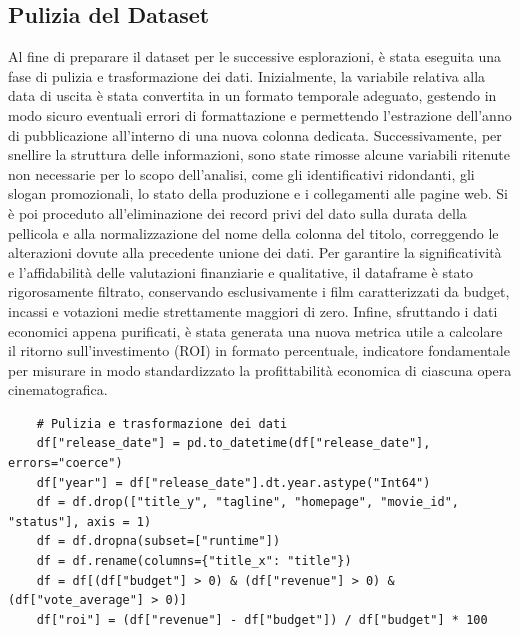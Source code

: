 \documentclass{article}
\begin{document}
\subsection{Pulizia del Dataset}
Al fine di preparare il dataset per le successive esplorazioni, \`e stata eseguita una fase di pulizia e trasformazione dei dati. Inizialmente, la variabile relativa alla data di uscita \`e stata convertita in un formato temporale adeguato, gestendo in modo sicuro eventuali errori di formattazione e permettendo l'estrazione dell'anno di pubblicazione all'interno di una nuova colonna dedicata. Successivamente, per snellire la struttura delle informazioni, sono state rimosse alcune variabili ritenute non necessarie per lo scopo dell'analisi, come gli identificativi ridondanti, gli slogan promozionali, lo stato della produzione e i collegamenti alle pagine web. Si \`e poi proceduto all'eliminazione dei record privi del dato sulla durata della pellicola e alla normalizzazione del nome della colonna del titolo, correggendo le alterazioni dovute alla precedente unione dei dati. Per garantire la significativit\`a e l'affidabilit\`a delle valutazioni finanziarie e qualitative, il dataframe \`e stato rigorosamente filtrato, conservando esclusivamente i film caratterizzati da budget, incassi e votazioni medie strettamente maggiori di zero. Infine, sfruttando i dati economici appena purificati, \`e stata generata una nuova metrica utile a calcolare il ritorno sull'investimento (ROI) in formato percentuale, indicatore fondamentale per misurare in modo standardizzato la profittabilit\`a economica di ciascuna opera cinematografica.
\begin{lstlisting}
	# Pulizia e trasformazione dei dati
	df["release_date"] = pd.to_datetime(df["release_date"], errors="coerce")
	df["year"] = df["release_date"].dt.year.astype("Int64")
	df = df.drop(["title_y", "tagline", "homepage", "movie_id", "status"], axis = 1)
	df = df.dropna(subset=["runtime"])
	df = df.rename(columns={"title_x": "title"})
	df = df[(df["budget"] > 0) & (df["revenue"] > 0) & (df["vote_average"] > 0)]
	df["roi"] = (df["revenue"] - df["budget"]) / df["budget"] * 100
\end{lstlisting}
\end{document}
